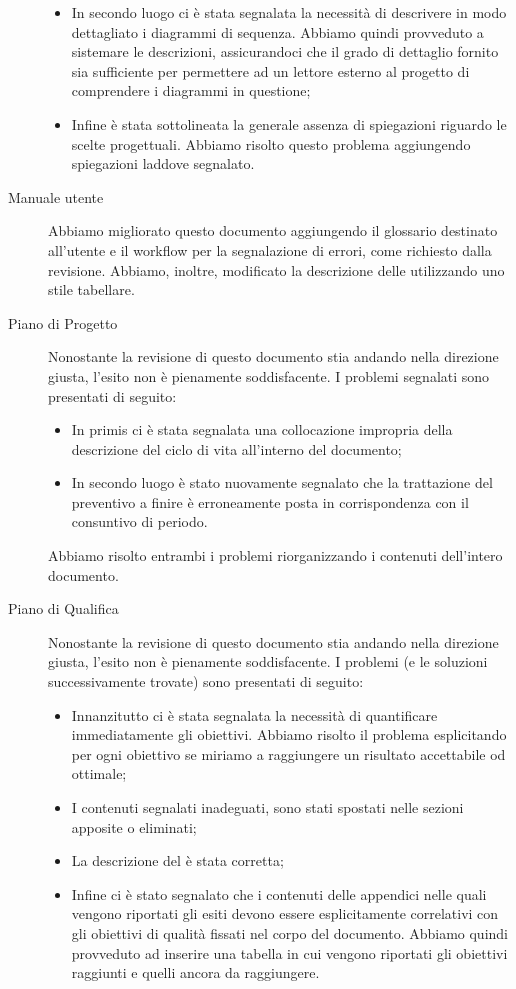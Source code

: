 \begin{description}
\begin{itemize}
                \item In secondo luogo ci è stata segnalata la necessità di descrivere in modo dettagliato i diagrammi di sequenza. Abbiamo quindi provveduto a sistemare le descrizioni, assicurandoci che il grado di dettaglio fornito sia sufficiente per permettere ad un lettore esterno al progetto di comprendere i diagrammi in questione;
                \item Infine è stata sottolineata la generale assenza di spiegazioni riguardo le scelte progettuali. Abbiamo risolto questo problema aggiungendo spiegazioni laddove segnalato.
            \end{itemize}
    \item[Manuale utente] Abbiamo migliorato questo documento aggiungendo il glossario destinato all'utente e il workflow per la segnalazione di errori, come richiesto dalla revisione. Abbiamo, inoltre, modificato la descrizione delle  utilizzando uno stile tabellare.
    \item[Piano di Progetto] Nonostante la revisione di questo documento stia andando nella direzione giusta, l'esito non è pienamente soddisfacente. I problemi segnalati sono presentati di seguito:
            \begin{itemize}
                \item In primis ci è stata segnalata una collocazione impropria della descrizione del ciclo di vita all'interno del documento;
                \item In secondo luogo è stato nuovamente segnalato che la trattazione del preventivo a finire è erroneamente posta in corrispondenza con il consuntivo di periodo.
            \end{itemize}
            Abbiamo risolto entrambi i problemi riorganizzando i contenuti dell'intero documento.
    \item[Piano di Qualifica] Nonostante la revisione di questo documento stia andando nella direzione giusta, l'esito non è pienamente soddisfacente. I problemi (e le soluzioni successivamente trovate) sono presentati di seguito:
            \begin{itemize}
               \item Innanzitutto ci è stata segnalata la necessità di quantificare immediatamente gli obiettivi. Abbiamo risolto il problema esplicitando per ogni obiettivo se miriamo a raggiungere un risultato accettabile od ottimale;
               \item I contenuti segnalati inadeguati, sono stati spostati nelle sezioni apposite o eliminati;
               \item La descrizione del  è stata corretta;
               \item Infine ci è stato segnalato che i contenuti delle appendici nelle quali vengono riportati gli esiti devono essere esplicitamente correlativi con gli obiettivi di qualità fissati nel corpo del documento. Abbiamo quindi provveduto ad inserire una tabella in cui vengono riportati gli obiettivi raggiunti e quelli ancora da raggiungere.
            \end{itemize}
    \end{description}
